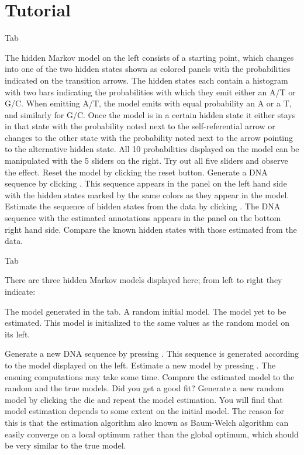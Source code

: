 \section{Tutorial}
\begin{enumerate}
  \I {} Tab
  \begin{enumerate}
    \I The hidden Markov model on the left consists of a starting
    point, which changes into one of the two hidden states
    shown as colored panels with the probabilities indicated on the
    transition arrows. The hidden states each contain a histogram with
    two bars indicating the probabilities with which they emit either
    an A/T or G/C. When emitting A/T, the model emits with equal
    probability an A or a T, and similarly for G/C. Once the model is
    in a certain hidden state it either stays in that state with the
    probability noted next to the self-referential arrow or changes to
    the other state with the probability noted next to the arrow
    pointing to the alternative hidden state. All 10 probabilities
    displayed on the model can be manipulated with the 5 sliders on the
    right. Try out all five sliders and observe the effect.
    \I Reset the model by clicking the reset button.
    \I Generate a DNA sequence by clicking \ty{>}. This sequence appears in the panel on the left hand
    side with
    the hidden states marked by the same colors as they appear in the
    model. 
    \I Estimate the sequence of hidden states from the data by
    clicking . The DNA
    sequence with the estimated annotations appears in the panel on
    the bottom right hand side. Compare the known hidden states with
    those estimated from the data.
  \end{enumerate}
  \I {} Tab 
  \begin{enumerate}
    \I There are three hidden Markov models displayed here; from left
    to right they indicate:
    \begin{itemize}
      \I The model generated in the  tab.
      \I A random initial model.
      \I The model yet to be estimated. This model is initialized to
      the same values as the random model on its left.
    \end{itemize}
    \I Generate a new DNA sequence by pressing \ty{>}. This
    sequence is generated according to the model displayed on the
    left.
    \I Estimate a new model by pressing . The ensuing
    computations may take some time.
    \I Compare the estimated model to the random and the true
    models. Did you get a good fit? 
    \I Generate a new random model by clicking the die and repeat the model
    estimation. You will find that model estimation depends to some
    extent on the initial model. The reason for this is that the
    estimation algorithm also known as Baum-Welch algorithm can easily
    converge on a local optimum rather than the global optimum, which
    should be very similar to the true model.
  \end{enumerate}
\end{enumerate}






